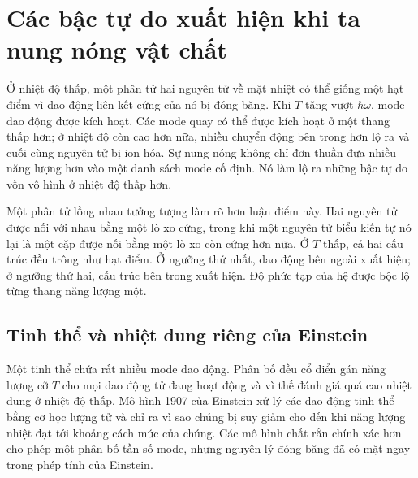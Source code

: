 \section{Các bậc tự do xuất hiện khi ta nung nóng vật chất}

Ở nhiệt độ thấp, một phân tử hai nguyên tử về mặt nhiệt có thể giống một hạt điểm vì dao động liên kết cứng của nó bị đóng băng. Khi \(T\) tăng vượt \(\hbar\omega\), mode dao động được kích hoạt. Các mode quay có thể được kích hoạt ở một thang thấp hơn; ở nhiệt độ còn cao hơn nữa, nhiều chuyển động bên trong hơn lộ ra và cuối cùng nguyên tử bị ion hóa. Sự nung nóng không chỉ đơn thuần đưa nhiều năng lượng hơn vào một danh sách mode cố định. Nó làm lộ ra những bậc tự do vốn vô hình ở nhiệt độ thấp hơn.

Một phân tử lồng nhau tưởng tượng làm rõ hơn luận điểm này. Hai nguyên tử được nối với nhau bằng một lò xo cứng, trong khi một nguyên tử biểu kiến tự nó lại là một cặp được nối bằng một lò xo còn cứng hơn nữa. Ở \(T\) thấp, cả hai cấu trúc đều trông như hạt điểm. Ở ngưỡng thứ nhất, dao động bên ngoài xuất hiện; ở ngưỡng thứ hai, cấu trúc bên trong xuất hiện. Độ phức tạp của hệ được bộc lộ từng thang năng lượng một.

\begin{classroomqa}
\end{classroomqa}

\subsection{Tinh thể và nhiệt dung riêng của Einstein}

Một tinh thể chứa rất nhiều mode dao động. Phân bố đều cổ điển gán năng lượng cỡ \(T\) cho mọi dao động tử đang hoạt động và vì thế đánh giá quá cao nhiệt dung ở nhiệt độ thấp. Mô hình 1907 của Einstein xử lý các dao động tinh thể bằng cơ học lượng tử và chỉ ra vì sao chúng bị suy giảm cho đến khi năng lượng nhiệt đạt tới khoảng cách mức của chúng. Các mô hình chất rắn chính xác hơn cho phép một phân bố tần số mode, nhưng nguyên lý đóng băng đã có mặt ngay trong phép tính của Einstein.

